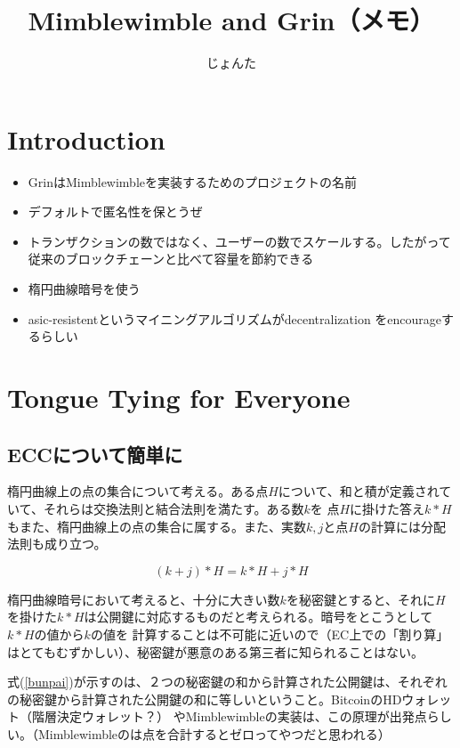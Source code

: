 \documentclass{jsarticle}
\begin{document}
\title{Mimblewimble and Grin（メモ）}
\author{じょんた}
\maketitle


\section{Introduction}
\begin{itemize}
    \item GrinはMimblewimbleを実装するためのプロジェクトの名前
    \item デフォルトで匿名性を保とうぜ
    \item トランザクションの数ではなく、ユーザーの数でスケールする。したがって従来のブロックチェーンと比べて容量を節約できる
    \item 楕円曲線暗号を使う
    \item asic-resistentというマイニングアルゴリズムがdecentralization をencourageするらしい
\end{itemize}

\section{Tongue Tying for Everyone}

\subsection{ECCについて簡単に}
楕円曲線上の点の集合について考える。ある点$H$について、和と積が定義されていて、それらは交換法則と結合法則を満たす。ある数$k$を
点$H$に掛けた答え$k*H$もまた、楕円曲線上の点の集合に属する。また、実数$k, j$と点$H$の計算には分配法則も成り立つ。

\begin{equation}\label{bunpai}
    (k+j)*H = k*H + j*H
\end{equation}

楕円曲線暗号において考えると、十分に大きい数$k$を秘密鍵とすると、それに$H$を掛けた$k*H$は公開鍵に対応するものだと考えられる。暗号をとこうとして$k*H$の値から$k$の値を
計算することは不可能に近いので（EC上での「割り算」はとてもむずかしい）、秘密鍵が悪意のある第三者に知られることはない。

式(\ref{bunpai})が示すのは、２つの秘密鍵の和から計算された公開鍵は、それぞれの秘密鍵から計算された公開鍵の和に等しいということ。BitcoinのHDウォレット（階層決定ウォレット？）
やMimblewimbleの実装は、この原理が出発点らしい。（Mimblewimbleのは点を合計するとゼロってやつだと思われる）
\end{document}
